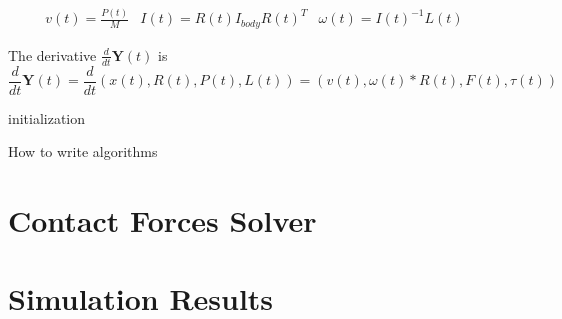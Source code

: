 \begin{align*}
    v(t) = \frac{P(t)}{M} &
    I(t) = R(t)I_{body}R(t)^{T} &
    \omega(t) = I(t)^{-1}L(t) &
\end{align*}

The derivative $\frac{d}{dt}\textbf{Y}(t)$ is
$$\frac{d}{dt}\textbf{Y}(t) = \frac{d}{dt}(x(t), R(t), P(t), L(t))=(v(t), \omega(t)*R(t), F(t), \tau(t))$$

\begin{algorithm}[H]
 initialization\;
 \caption{How to write algorithms}
\end{algorithm}


\section{Contact Forces Solver}

\section{Simulation Results}